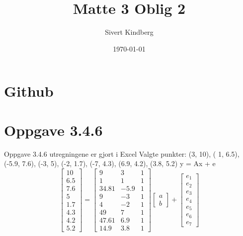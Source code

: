 \documentclass[a4paper,norsk]{article}
\title{Matte 3 Oblig 2}
\date{\today}
\author{Sivert Kindberg}
\begin{document}
\maketitle
\tableofcontents
\newpage
 \section{Github}


\section{Oppgave 3.4.6}
Oppgave 3.4.6
utregningene er gjort i Excel \newline
Valgte punkter: (3, 10), ( 1, 6.5), (-5.9, 7.6), (-3, 5), (-2, 1.7), (-7, 4.3), (6.9, 4.2), (3.8, 5.2)\newline
\newline
y = Ax + e 
\newline
\begin{equation*} 
\begin{bmatrix}10 \\ 6.5\\7.6\\5\\1.7\\4.3\\4.2\\5.2\end{bmatrix}
=\begin{bmatrix}9 & 3 & 1 \\ 1 & 1 & 1 \\34.81 & -5.9 & 1 \\ 9 & -3 & 1 \\4 & -2 & 1 \\49& 7 & 1 \\47.61 & 6.9 & 1 \\ 14.9 & 3.8 & 1\end{bmatrix}\begin{bmatrix}a\\b\end{bmatrix}
+ \begin{bmatrix} e_1 \\ e_2 \\ e_3 \\ e_4 \\ e_5 \\ e_6 \\ e_7\end{bmatrix}
\end{equation*}
\end{document}

